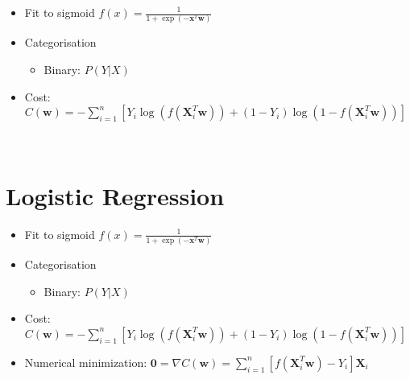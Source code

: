 \documentclass[11pt]{article}
\begin{document}
\begin{itemize}
    \item Fit to sigmoid $f(x) = \frac{1}{1 + \exp(-\boldsymbol{x}^T\boldsymbol{w})}$
\end{itemize}
\begin{center}
\end{center}
\begin{itemize}
    \item Categorisation
        \begin{itemize}
            \item Binary: $P(Y|X)$
        \end{itemize}
    \item Cost: $C(\boldsymbol{w}) = -\sum\limits_{i=1}^n \left[Y_i\log\left(f\left(\boldsymbol{X}_i^T\boldsymbol{w}\right)\right) + (1 - Y_i)\log\left(1 - f\left(\boldsymbol{X}_i^T\boldsymbol{w}\right)\right)\right]$
\end{itemize}
{ \hspace*{\fill} \\}

\newpage
\hypertarget{logistic-regression}{%
\section*{Logistic Regression}\label{logistic-regression5}}

\begin{itemize}
    \item Fit to sigmoid $f(x) = \frac{1}{1 + \exp(-\boldsymbol{x}^T\boldsymbol{w})}$
\end{itemize}
\begin{center}
\end{center}
\begin{itemize}
    \item Categorisation
        \begin{itemize}
            \item Binary: $P(Y|X)$
        \end{itemize}
    \item Cost: $C(\boldsymbol{w}) = -\sum\limits_{i=1}^n \left[Y_i\log\left(f\left(\boldsymbol{X}_i^T\boldsymbol{w}\right)\right) + (1 - Y_i)\log\left(1 - f\left(\boldsymbol{X}_i^T\boldsymbol{w}\right)\right)\right]$
    \item Numerical minimization: $\boldsymbol{0} = \nabla C(\boldsymbol{w}) = \sum\limits_{i=1}^n\left[f\left(\boldsymbol{X}_i^T\boldsymbol{w}\right) - Y_i\right]\boldsymbol{X}_i$
\end{itemize}
{ \hspace*{\fill} \\}
\end{document}
